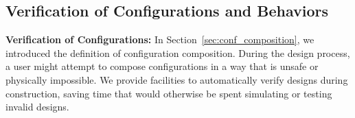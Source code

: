 \documentclass[graybox]{svmult}
\newcommand{\TODO}[1]{ {\bf \textcolor{red}{TODO:} #1 }}
\begin{document}
% 
% 
\subsection{ Verification of Configurations and Behaviors} \label{sec:verify}

{\bf Verification of Configurations: }
In Section~\ref{sec:conf_composition}, we introduced the definition of configuration composition. During the design process, a user might attempt to compose configurations in a way that is unsafe or physically impossible. We provide facilities to automatically verify designs during construction, saving time that would otherwise be spent simulating or testing invalid designs.
\end{document}
